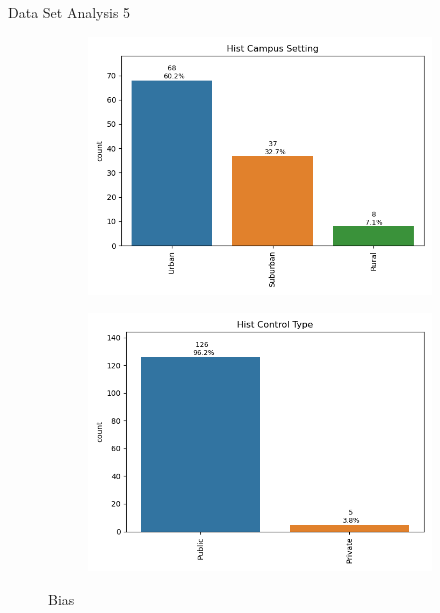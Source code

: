 \documentclass[xcolor=table]{beamer} %
\begin{document}
\begin{frame}{Data Set Analysis 5}
\begin{figure}
\begin{subfigure}[b]{0.48\textwidth}
          \label{fig:hist_international}
      \end{subfigure}
      \hfill
      \vspace{-0.6cm}
      \begin{subfigure}[b]{0.35\textwidth}
        \centering
        \includegraphics[width=\textwidth, trim={0 0 0 0}, clip]{./figs/bar_hist campus setting.png}
        \label{fig:hist_campus}
      \end{subfigure}
      \hfill
      \begin{subfigure}[b]{0.35\textwidth}
        \centering
        \includegraphics[width=\textwidth, trim={0 0 0 0}, clip]{./figs/bar_hist control type.png}
        \label{fig:hist_control_type}
      \end{subfigure}
    \vspace{-1.5cm}
    \caption{Bias}
    \label{fig:analysis_5}
    \end{figure}
\end{frame}
\end{document}
